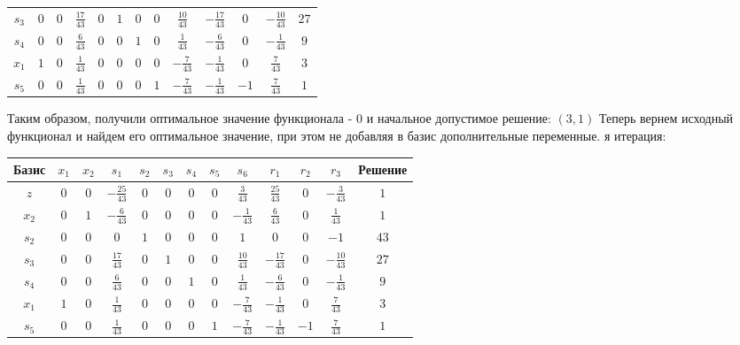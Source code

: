 \documentclass{article}%
\begin{document}
\begin{flushleft}
\begin{tabular}{|c|ccccccccccc|c|}
$s_{3}$&$0$&$0$&$\frac{17}{43}$&$0$&$1$&$0$&$0$&$\frac{10}{43}$&$-\frac{17}{43}$&$0$&$-\frac{10}{43}$&$27$\\%
$s_{4}$&$0$&$0$&$\frac{6}{43}$&$0$&$0$&$1$&$0$&$\frac{1}{43}$&$-\frac{6}{43}$&$0$&$-\frac{1}{43}$&$9$\\%
$x_{1}$&$1$&$0$&$\frac{1}{43}$&$0$&$0$&$0$&$0$&$-\frac{7}{43}$&$-\frac{1}{43}$&$0$&$\frac{7}{43}$&$3$\\%
$s_{5}$&$0$&$0$&$\frac{1}{43}$&$0$&$0$&$0$&$1$&$-\frac{7}{43}$&$-\frac{1}{43}$&$-1$&$\frac{7}{43}$&$1$\\%
\hline%
\end{tabular}%
\newline%
\newline%
Таким образом, получили оптимальное значение функционала {-} 0 и начальное допустимое решение: %
$(3, 1)$%
\newline%
Теперь вернем исходный функционал и найдем его оптимальное значение, при этом не добавляя в базис дополнительные переменные.%
я итерация: %
\newline%
\newline%
\renewcommand{\arraystretch}{1.3}%
\begin{tabular}{|c|ccccccccccc|c|}%
\hline%
Базис&$x_{1}$&$x_{2}$&$s_{1}$&$s_{2}$&$s_{3}$&$s_{4}$&$s_{5}$&$s_{6}$&$r_{1}$&$r_{2}$&$r_{3}$&Решение\\%
\hline%
$z$&$0$&$0$&$-\frac{25}{43}$&$0$&$0$&$0$&$0$&$\frac{3}{43}$&$\frac{25}{43}$&$0$&$-\frac{3}{43}$&$1$\\%
\hline%
$x_{2}$&$0$&$1$&$-\frac{6}{43}$&$0$&$0$&$0$&$0$&$-\frac{1}{43}$&$\frac{6}{43}$&$0$&$\frac{1}{43}$&$1$\\%
$s_{2}$&$0$&$0$&$0$&$1$&$0$&$0$&$0$&$1$&$0$&$0$&$-1$&$43$\\%
$s_{3}$&$0$&$0$&$\frac{17}{43}$&$0$&$1$&$0$&$0$&$\frac{10}{43}$&$-\frac{17}{43}$&$0$&$-\frac{10}{43}$&$27$\\%
$s_{4}$&$0$&$0$&$\frac{6}{43}$&$0$&$0$&$1$&$0$&$\frac{1}{43}$&$-\frac{6}{43}$&$0$&$-\frac{1}{43}$&$9$\\%
$x_{1}$&$1$&$0$&$\frac{1}{43}$&$0$&$0$&$0$&$0$&$-\frac{7}{43}$&$-\frac{1}{43}$&$0$&$\frac{7}{43}$&$3$\\%
$s_{5}$&$0$&$0$&$\frac{1}{43}$&$0$&$0$&$0$&$1$&$-\frac{7}{43}$&$-\frac{1}{43}$&$-1$&$\frac{7}{43}$&$1$\\%
\hline%
\end{tabular}%
\newline%
\newline%

\end{flushleft}
\end{document}
